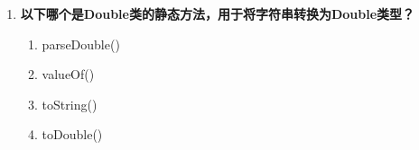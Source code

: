 \documentclass[12pt, a4paper]{ctexart}
\begin{document}
\begin{enumerate}[label=\textbf{\arabic*.}]
\begin{bluebox}{答案与深度解析}
\begin{itemize}[label={}, leftmargin=*, nosep]
\begin{itemize}[label={}, nosep]
			      \item 装箱(Autoboxing)：int → Integer

					  \end{itemize}
		      \item \textbf{B. Integer是int的包装类 — 正确}
					  \begin{itemize}[label={}, nosep]
		      
			      \item 八大基本类型都有对应包装类
		      

					  \end{itemize}
		      \item \textbf{C. 包装类的对象不可变 — 正确}
					  \begin{itemize}[label={}, nosep]
		      
			      \item Integer等包装类都是不可变类（immutable）
		      

					  \end{itemize}
		      \item \textbf{D. 包装类可以提高基本数据类型的操作效率 — 错误}
					  \begin{itemize}[label={}, nosep]
		      
			      \item 恰恰相反，包装类有额外开销，效率更低
			      \item 包装类主要用于集合操作、泛型等需要对象的场景
		      

		      
					  \end{itemize}
					  \end{itemize}
\textbf{【应背诵知识点】}

		      包装类特点：
		      \begin{itemize}[label={}, nosep]
			      \item 基本类型与包装类的转换（装箱/拆箱）
			      \item 自动装箱：Integer i = 10;（JDK5+）
			      \item 不可变性保证线程安全
			      \item 缓存机制：Integer IntegerCache [-128, 127]
		      \end{itemize}
		      \end{bluebox}

	      \vspace{1em}

	\item \textbf{以下哪个是Double类的静态方法，用于将字符串转换为Double类型？}
	      \begin{enumerate}[label=\Alph*.]
		      \item parseDouble()
		      \item valueOf()
		      \item toString()
		      \item toDouble()
	      \end{enumerate}


\end{enumerate}
\end{document}
